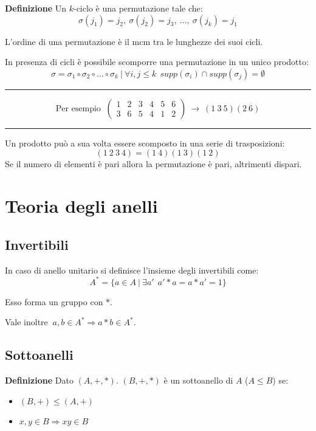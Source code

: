 \documentclass{article}
\begin{document}
\noindent\textbf{Definizione} Un $k$-ciclo è una permutazione tale che: 
$$\sigma(j_1)=j_2,\ \sigma(j_2)=j_3,\ \ldots,\ \sigma(j_k)=j_1$$\newline

\noindent L'ordine di una permutazione è il mcm tra le lunghezze dei suoi cicli.\newline

\noindent In presenza di cicli è possibile scomporre una permutazione in un unico prodotto:
$$\sigma=\sigma_1\circ\sigma_2\circ\ldots\circ\sigma_k\ |\ \forall i,j\leq k\ \ supp(\sigma_i)\cap supp(\sigma_j)=\emptyset$$

\noindent\rule{\textwidth}{0.5pt}

$$\text{Per esempio }\ \begin{pmatrix}
    1 & 2 & 3 & 4 & 5 & 6\\
    3 & 6 & 5 & 4 & 1 & 2
\end{pmatrix}\ \longrightarrow\ (1\ 3\ 5)(2\ 6)$$

\noindent\rule{\textwidth}{0.5pt}\newline

\noindent Un prodotto può a sua volta essere scomposto in una serie di trasposizioni:
$$(1\ 2\ 3\ 4)=(1\ 4)(1\ 3)(1\ 2)$$
\noindent Se il numero di elementi è pari allora la permutazione è pari, altrimenti dispari.\newline

\section{Teoria degli anelli}

\subsection{Invertibili}

In caso di anello unitario si definisce l'insieme degli invertibili come:
$$A^*=\{a\in A\ |\ \exists a'\ \ a'*a=a*a'=1\}$$

\noindent Esso forma un gruppo con $*$.

\vspace{5pt}

\noindent Vale inoltre $\ a,b\in A^*\Rightarrow a*b\in A^*$.

\subsection{Sottoanelli}

\noindent\textbf{Definizione} Dato $(A,+,*)$. $(B,+,*)$ è un sottoanello di $A$ ($A\leqslant B$) se:
\begin{itemize}
    \item $(B,+)\leqslant(A,+)$
    \item $x,y\in B\Rightarrow xy\in B$\newline
\end{itemize}
\end{document}
